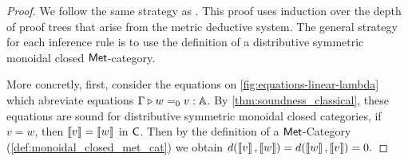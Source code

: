 \begin{proof}
  We follow the same strategy as \cite{dahlqvist2022syntactic}.
  This proof uses induction over the depth of proof trees that
  arise from the metric deductive system. The general strategy for each
  inference rule is to use the definition of a distributive symmetric monoidal closed $\mathsf{Met}$-category. 

   More concretly, first, consider the equations on \autoref{fig:equations-linear-lambda} which abreviate equations $\Gamma \triangleright w =_0 v : \mathbb{A}$. By \autoref{thm:soundness_classical}, these equations are sound for distributive symmetric monoidal closed categories, \ie if $v=w$, then $\left \llbracket v \right \rrbracket=\left \llbracket w \right \rrbracket$ in $ \mathsf{C}$. Then by the definition of a $\mathsf{Met}$-Category (\autoref{def:monoidal_closed_met_cat}) we obtain $d(\left \llbracket v \right \rrbracket,\left \llbracket w \right \rrbracket) = d(\left \llbracket w \right \rrbracket,\left \llbracket v \right \rrbracket)=0.$ 
 

\end{proof}
